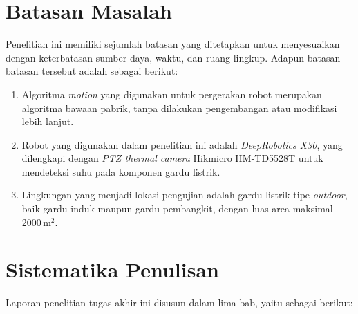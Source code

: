 \newpage


\section{Batasan Masalah}
\label{sec:batasanmasalah}

Penelitian ini memiliki sejumlah batasan yang ditetapkan untuk menyesuaikan dengan keterbatasan sumber daya, waktu, dan ruang lingkup. Adapun batasan-batasan tersebut adalah sebagai berikut:
\begin{enumerate}
    \item Algoritma \emph{motion} yang digunakan untuk pergerakan robot merupakan algoritma bawaan pabrik, tanpa dilakukan pengembangan atau modifikasi lebih lanjut.
    
    \item Robot yang digunakan dalam penelitian ini adalah \emph{DeepRobotics X30}, yang dilengkapi dengan \emph{PTZ thermal camera} Hikmicro HM-TD5528T untuk mendeteksi suhu pada komponen gardu listrik.
    
    \item Lingkungan yang menjadi lokasi pengujian adalah gardu listrik tipe \emph{outdoor}, baik gardu induk maupun gardu pembangkit, dengan luas area maksimal 2000\,m$^2$.
\end{enumerate}


\section{Sistematika Penulisan}
\label{sec:sistematikapenulisan}

Laporan penelitian tugas akhir ini disusun dalam lima bab, yaitu sebagai berikut:

